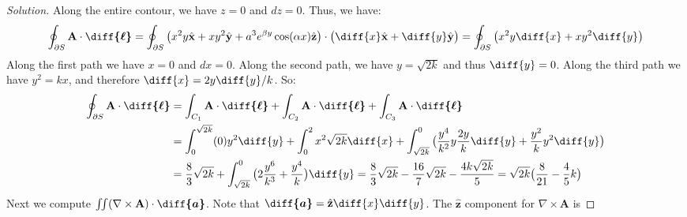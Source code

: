 \documentclass[crop=false,class=article,oneside]{standalone}
\begin{document}
        \begin{proof}[Solution]
            Along the entire contour, we have $z=0$ and $dz=0$.
            Thus, we have:
            \begin{equation*}
                \oint_{\partial S}
                \mathbf{A}\cdot\boldsymbol{\diff{\ell}}
                =\oint_{\partial S}
                \big(
                     x^{2}y\hat{\mathbf{x}}
                    +xy^{2}\hat{\mathbf{y}}
                    +a^{3}e^{\beta{y}}\cos(\alpha{x})\hat{\mathbf{z}}
                \big)
                \cdot\big(
                     \diff{x}\hat{\mathbf{x}}
                    +\diff{y}\hat{\mathbf{y}}
                \big)
                =\oint_{\partial S}
                \big(x^{2}y\diff{x}+xy^{2}\diff{y}\big)
            \end{equation*}
            Along the first path we have $x=0$ and $dx=0$.
            Along the second path, we
            have $y=\sqrt{2k}$ and thus $\diff{y}=0$.
            Along the third path we have $y^{2}=kx$,
            and therefore $\diff{x}=2y\diff{y}/k$. So:
            \begin{align*}
                \oint_{\partial S}
                \mathbf{A}\cdot\boldsymbol{\diff{\ell}}
                &=\int_{C_{1}}\mathbf{A}
                \cdot\boldsymbol{\diff{\ell}}
                +\int_{C_{2}}\mathbf{A}
                \cdot\boldsymbol{\diff{\ell}}
                +\int_{C_{3}}
                \mathbf{A}\cdot\boldsymbol{\diff{\ell}}\\
                &=\int_{0}^{\sqrt{2k}}(0)y^{2}\diff{y}
                 +\int_{0}^{2}x^{2}\sqrt{2k}\diff{x}
                 +\int_{\sqrt{2k}}^{0}\big(
                    \frac{y^{4}}{k^2}y\frac{2y}{k}\diff{y}
                    +\frac{y^{2}}{k}y^{2}\diff{y}
                \big)\\
                &=\frac{8}{3}\sqrt{2k}
                 +\int_{\sqrt{2k}}^{0}\big(2\frac{y^{6}}{k^{3}}
                 +\frac{y^{4}}{k}\big)\diff{y}
                =\frac{8}{3}\sqrt{2k}
                -\frac{16}{7}\sqrt{2k}
                -\frac{4k\sqrt{2k}}{5}
                =\sqrt{2k}\big(\frac{8}{21}-\frac{4}{5}k\big)
            \end{align*}
            Next we compute
            $\iint(\nabla\times\mathbf{A})%
             \cdot\boldsymbol{\diff{a}}$.
            Note that
            $\boldsymbol{\diff{a}}%
             =\hat{\mathbf{z}}\diff{x}\diff{y}$.
            The $\hat{\mathbf{z}}$
            component for $\nabla\times\mathbf{A}$ is

\end{proof}
\end{document}
